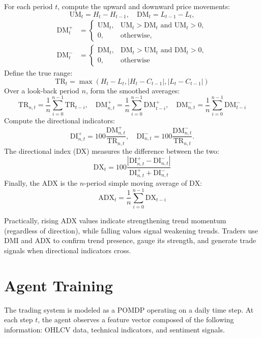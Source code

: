 For each period \(t\), compute the upward and downward price movements:
\[\mathrm{UM}_t = H_t - H_{t-1}, \quad \mathrm{DM}_t = L_{t-1} - L_t,\]
\[
  \begin{aligned}
    \mathrm{DM}^+_t &=
    \begin{cases}
      \mathrm{UM}_t, & \mathrm{UM}_t > \mathrm{DM}_t \text{ and } \mathrm{UM}_t > 0,\\
      0, & \text{otherwise},
    \end{cases}
    \\
    \mathrm{DM}^-_t &=
    \begin{cases}
      \mathrm{DM}_t, & \mathrm{DM}_t > \mathrm{UM}_t \text{ and } \mathrm{DM}_t > 0,\\
      0, & \text{otherwise}
    \end{cases}
  \end{aligned}
\]
Define the true range:
\[\mathrm{TR}_t = \max(H_t - L_t, |H_t - C_{t-1}|, |L_t - C_{t-1}|)\]
Over a look‐back period \(n\), form the smoothed averages:
\[\mathrm{TR}_{n,t} = \frac{1}{n} \sum_{i=0}^{n-1} \mathrm{TR}_{t-i}, \quad \mathrm{DM}^+_{n,t} = \frac{1}{n} \sum_{i=0}^{n-1}\mathrm{DM}^+_{t-i}, \quad \mathrm{DM}^-_{n,t} = \frac{1}{n} \sum_{i=0}^{n-1} \mathrm{DM}^-_{t-i}\]
Compute the directional indicators:
\[\mathrm{DI}^+_{n,t} =100 \frac{\mathrm{DM}^+_{n,t}}{\mathrm{TR}_{n,t}}, \quad \mathrm{DI}^-_{n,t} = 100 \frac{\mathrm{DM}^-_{n,t}}{\mathrm{TR}_{n,t}}.\]
The directional index (DX) measures the difference between the two:
\[\mathrm{DX}_t = 100 \frac{|\mathrm{DI}^+_{n,t} - \mathrm{DI}^-_{n,t}|}{\mathrm{DI}^+_{n,t} + \mathrm{DI}^-_{n,t}}\]
Finally, the \gls{ADX} is the \(n\)-period simple moving average of \(\mathrm{DX}\):
\[\mathrm{ADX}_t = \frac{1}{n} \sum_{i=0}^{n-1} \mathrm{DX}_{t-i}\]

Practically, rising \gls{ADX} values indicate strengthening trend momentum (regardless of direction), while falling values signal weakening trends. Traders use \gls{DMI} and \gls{ADX} to confirm trend presence, gauge its strength, and generate trade signals when directional indicators cross.

\section{Agent Training}
The trading system is modeled as a \gls{POMDP} operating on a daily time step. At each step \(t\), the agent observes a feature vector composed of the following information: \gls{OHLCV} data, technical indicators, and sentiment signals.

